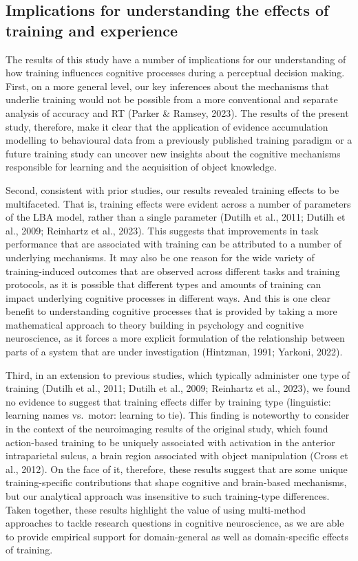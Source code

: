 \documentclass[
  man, donotrepeattitle,floatsintext]{apa6}
\begin{document}
\subsection{Implications for understanding the effects of training and experience}\label{implications-for-understanding-the-effects-of-training-and-experience}

The results of this study have a number of implications for our understanding of how training influences cognitive processes during a perceptual decision making. First, on a more general level, our key inferences about the mechanisms that underlie training would not be possible from a more conventional and separate analysis of accuracy and RT (Parker \& Ramsey, 2023). The results of the present study, therefore, make it clear that the application of evidence accumulation modelling to behavioural data from a previously published training paradigm or a future training study can uncover new insights about the cognitive mechanisms responsible for learning and the acquisition of object knowledge.

Second, consistent with prior studies, our results revealed training effects to be multifaceted. That is, training effects were evident across a number of parameters of the LBA model, rather than a single parameter (Dutilh et al., 2011; Dutilh et al., 2009; Reinhartz et al., 2023). This suggests that improvements in task performance that are associated with training can be attributed to a number of underlying mechanisms. It may also be one reason for the wide variety of training-induced outcomes that are observed across different tasks and training protocols, as it is possible that different types and amounts of training can impact underlying cognitive processes in different ways. And this is one clear benefit to understanding cognitive processes that is provided by taking a more mathematical approach to theory building in psychology and cognitive neuroscience, as it forces a more explicit formulation of the relationship between parts of a system that are under investigation (Hintzman, 1991; Yarkoni, 2022).

Third, in an extension to previous studies, which typically administer one type of training (Dutilh et al., 2011; Dutilh et al., 2009; Reinhartz et al., 2023), we found no evidence to suggest that training effects differ by training type (linguistic: learning names vs.~motor: learning to tie). This finding is noteworthy to consider in the context of the neuroimaging results of the original study, which found action-based training to be uniquely associated with activation in the anterior intraparietal sulcus, a brain region associated with object manipulation (Cross et al., 2012). On the face of it, therefore, these results suggest that are some unique training-specific contributions that shape cognitive and brain-based mechanisms, but our analytical approach was insensitive to such training-type differences. Taken together, these results highlight the value of using multi-method approaches to tackle research questions in cognitive neuroscience, as we are able to provide empirical support for domain-general as well as domain-specific effects of training.
\end{document}
